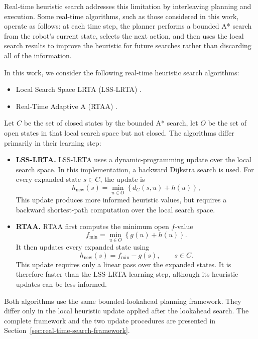 \documentclass[11pt]{article}
\begin{document}
Real-time heuristic search addresses this limitation by interleaving planning and execution. Some real-time algorithms, such as those considered in this work, operate as follows: at each time step, the planner performs a bounded A* search from the robot's current state, selects the next action, and then uses the local search results to improve the heuristic for future searches rather than discarding all of the information.

In this work, we consider the following real-time heuristic search algorithms:

\begin{itemize}
  \item Local Search Space LRTA (LSS-LRTA) \cite{koenig2009lsslrta}\cite{korf1990realtime}.
  \item Real-Time Adaptive A (RTAA) \cite{koenig2006rtaa}.
\end{itemize}

Let \(C\) be the set of closed states by the bounded A* search, let \(O\) be the set of open states in that local search space but not closed. The algorithms differ primarily in their learning step:

\begin{itemize}
  \item \textbf{LSS-LRTA.}
        LSS-LRTA uses a dynamic-programming update over the local search space. In this implementation, a backward Dijkstra search is used. For every expanded state \(s\in C\), the update is
        \[
          h_{\mathrm{new}}(s)
          =
          \min_{u\in O}
          \left\{
          d_C(s,u)+h(u)
          \right\},
        \]
        This update produces more informed heuristic values, but requires a backward shortest-path computation over the local search space.

  \item \textbf{RTAA.}
        RTAA first computes the minimum open \(f\)-value
        \[
          f_{\min}
          =
          \min_{u\in O}
          \left\{
          g(u)+h(u)
          \right\}.
        \]
        It then updates every expanded state using
        \[
          h_{\mathrm{new}}(s)=f_{\min}-g(s),
          \qquad s\in C.
        \]
        This update requires only a linear pass over the expanded states. It is therefore faster than the LSS-LRTA learning step, although its heuristic updates can be less informed.
\end{itemize}

Both algorithms use the same bounded-lookahead planning framework. They differ only
in the local heuristic update applied after the lookahead search. The complete
framework and the two update procedures are presented in
Section~\ref{sec:real-time-search-framework}.
\end{document}
